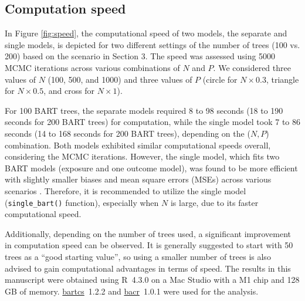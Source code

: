 \subsection{Computation speed}\label{sec:speed}
In Figure \ref{fig:speed}, the computational speed of two models, the separate and single models, is depicted for two different settings of the number of trees (100 vs. 200) based on the scenario in Section 3. The speed was assessed using 5000 MCMC iterations across various combinations of $N$ and $P$. We considered three values of $N$ (100, 500, and 1000) and three values of $P$ (circle for $N\times 0.3$, triangle for $N\times 0.5$, and cross for $N\times 1$).

For 100 BART trees, the separate models required 8 to 98 seconds (18 to 190 seconds for 200 BART trees) for computation, while the single model took 7 to 86 seconds (14 to 168 seconds for 200 BART trees), depending on the ($N, P$) combination. Both models exhibited similar computational speeds overall, considering the MCMC iterations. However, the single model, which fits two BART models (exposure and one outcome model), was found to be more efficient with slightly smaller biases and mean square errors (MSEs) across various scenarios \citep{kim2023bnp}. Therefore, it is recommended to utilize the single model (\verb|single_bart()| function), especially when $N$ is large, due to its faster computational speed.

Additionally, depending on the number of trees used, a significant improvement in computation speed can be observed. It is generally suggested to start with 50 trees as a ``good starting value'', \citep{kapelner2013bartmachine} so using a smaller number of trees is also advised to gain computational advantages in terms of speed.
The results in this manuscript were obtained using R~4.3.0 on a Mac Studio with
a M1 chip and 128 GB of memory. \href{https://cran.r-project.org/package=bartcs}{bartcs}~1.2.2 and \href{https://cran.r-project.org/package=bacr}{bacr}~1.0.1 were used for the analysis.


